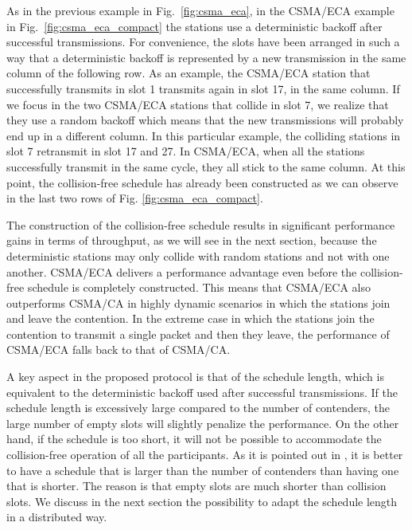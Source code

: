 \documentclass[journal]{IEEEtran}
\begin{document}
As in the previous example in Fig.~\ref{fig:csma_eca}, in the CSMA/ECA example in Fig.~\ref{fig:csma_eca_compact} the stations use a deterministic backoff after successful transmissions.
For convenience, the slots have been arranged in such a way that a deterministic backoff is represented by a new transmission in the same column of the following row.
As an example, the CSMA/ECA station that successfully transmits in slot 1 transmits again in slot 17, in the same column.
If we focus in the two CSMA/ECA stations that collide in slot 7, we realize that they use a random backoff which means that the new transmissions will probably end up in a different column.
In this particular example, the colliding stations in slot 7 retransmit in slot 17 and 27.
In CSMA/ECA, when all the stations successfully transmit in the same cycle, they all stick to the same column.
At this point, the collision-free schedule has already been constructed as we can observe in the last two rows of Fig. \ref{fig:csma_eca_compact}.

The construction of the collision-free schedule results in significant performance gains in terms of throughput, as we will see in the next section, because the deterministic stations may only collide with random stations and not with one another.
CSMA/ECA delivers a performance advantage even before the collision-free schedule is completely constructed.
This means that CSMA/ECA also outperforms CSMA/CA in highly dynamic scenarios in which the stations join and leave the contention.
In the extreme case in which the stations join the contention to transmit a single packet and then they leave, the performance of CSMA/ECA falls back to that of CSMA/CA.

A key aspect in the proposed protocol is that of the schedule length, which is equivalent to the deterministic backoff used after successful transmissions.
If the schedule length is excessively large compared to the number of contenders, the large number of empty slots will slightly penalize the performance.
On the other hand, if the schedule is too short, it will not be possible to accommodate the collision-free operation of all the participants.
As it is pointed out in \cite{fang2011dlm}, it is better to have a schedule that is larger than the number of contenders than having one that is shorter.
The reason is that empty slots are much shorter than collision slots.
We discuss in the next section the possibility to adapt the schedule length in a distributed way.
\end{document}
